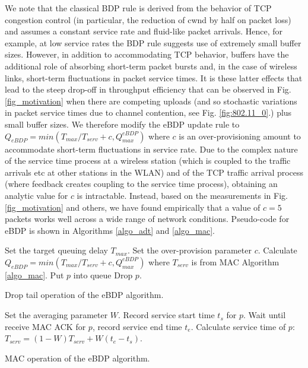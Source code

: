 \documentclass[10pt,twocolumn, journal]{IEEEtran}
\begin{document}
We note that the classical BDP rule is derived from the behavior of TCP congestion control (in particular, the reduction of cwnd by half on packet loss) and assumes a constant service rate and fluid-like packet arrivals.  Hence, for example, at low service rates the BDP rule suggests use of extremely small buffer sizes.   However, in addition to accommodating TCP behavior, buffers have the additional role of absorbing short-term packet bursts and, in the case of wireless links, short-term fluctuations in packet service times.  It is these latter effects that lead to the steep drop-off in throughput efficiency that can be observed in Fig. \ref{fig_motivation}  when there are competing uploads (and so stochastic variations in packet service times due to channel contention, see Fig. \ref{fig:802.11_0}.) plus small buffer sizes.   We therefore modify the eBDP update rule to $Q_{eBDP}=min(T_{max}/T_{serv}+c,Q_{max}^{eBDP})$
where $c$ is an over-provisioning amount to accommodate short-term fluctuations in
service rate.  Due to the complex nature of the service time process at a wireless station (which is coupled to the traffic arrivals etc at other stations in the WLAN) and of the TCP traffic arrival process (where feedback creates coupling to the service time process), obtaining an analytic value for $c$ is intractable.  Instead, based on the measurements in Fig. \ref{fig_motivation} and others, we have found empirically that a value of $c=5$ packets works well across a wide range of network conditions. Pseudo-code for eBDP is shown in Algorithms \ref{algo_adt} and \ref{algo_mac}.



\begin{algorithm}[tb]
    \begin{algorithmic}[1]
        \STATE Set the target queuing delay $T_{max}$.
        \STATE Set the over-provision parameter $c$.
            \STATE Calculate  $Q_{eBDP}=min(T_{max}/T_{serv}+c,Q_{max}^{eBDP})$
            where $T_{serv}$ is from MAC Algorithm \ref{algo_mac}.
                \STATE Put $p$ into queue
            \ELSE
                \STATE Drop $p$.
            \ENDIF
        \ENDFOR
    \end{algorithmic}
    \caption{Drop tail operation of the eBDP algorithm.}
    \label{algo_adt}
\end{algorithm}

\begin{algorithm}[tb]
    \begin{algorithmic}[1]
        \STATE Set the averaging parameter $W$.
            \STATE Record service start time $t_s$ for $p$.
            \STATE Wait until receive MAC ACK for $p$, record service end time $t_e$.
            \STATE Calculate service time of $p$: $T_{serv} = (1-W) T_{serv} + W(t_e-t_s) $.
        \ENDFOR
    \end{algorithmic}
    \caption{MAC operation of the eBDP algorithm.}
    \label{algo_mac}
\end{algorithm}
\end{document}
